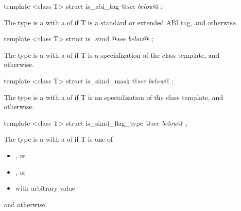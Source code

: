 \begin{itemdecl}
template <class T> struct is_abi_tag { @\emph{see below}@ };
\end{itemdecl}
\begin{itemdescr}
  \pnum The type  is a \UnaryTypeTrait with a \BaseCharacteristic of  if \type T is a standard or extended ABI tag, and  otherwise.
\end{itemdescr}

\begin{itemdecl}
template <class T> struct is_simd { @\emph{see below}@ };
\end{itemdecl}
\begin{itemdescr}
  \pnum The type  is a \UnaryTypeTrait with a \BaseCharacteristic of  if \type T is a specialization of the \simd class template, and  otherwise.
\end{itemdescr}

\begin{itemdecl}
template <class T> struct is_simd_mask { @\emph{see below}@ };
\end{itemdecl}
\begin{itemdescr}
  \pnum The type  is a \UnaryTypeTrait with a \BaseCharacteristic of  if \type T is an specialization of the \mask class template, and  otherwise.
\end{itemdescr}

\begin{itemdecl}
template <class T> struct is_simd_flag_type { @\emph{see below}@ };
\end{itemdecl}
\begin{itemdescr}
  \pnum The type  is a \UnaryTypeTrait with a \BaseCharacteristic of  if \type T is one of
  \begin{itemize}
    \item {}, or
    \item {}, or
    \item {} with arbitrary value 
  \end{itemize}
  and  otherwise.
\end{itemdescr}

